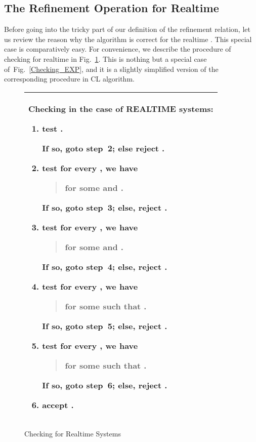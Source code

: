 \documentclass{llncs}
\begin{document}
\subsection{The Refinement Operation for Realtime }\label{subsec:Expansion_Pre}
Before going into the tricky part of our definition of the refinement relation, let us review the reason why the algorithm is correct for the realtime  . This special case is comparatively easy.  For convenience, we describe the procedure of checking  for realtime  in Fig.~\ref{Checking_EXP_REALTIME}. This is nothing but a special case of~Fig.~\ref{Checking_EXP}, and it is a slightly simplified version of the corresponding procedure in CL algorithm.

\begin{figure}[tbp]
\begin{center}
\begin{tabular}{|p{12cm}|}\hline \vspace{0ex}
\textbf{\normalsize Checking   in the case of REALTIME systems:}
\begin{enumerate}
\item
\textbf{test}
  .

If so, goto step~2; else \textbf{reject} . \vspace{1ex}

\item
\textbf{test} for every , we have
\begin{quote}
 for some  and .
\end{quote}
If so, goto step~3; else, \textbf{reject} . \vspace{1ex}

\item
\textbf{test} for every , we have
\begin{quote}
  for some  and .
\end{quote}
If so, goto step~4; else, \textbf{reject} . \vspace{1ex}




\item
\textbf{test}  for every , we have
\begin{quote}
     for some  such that .
\end{quote}
If so, goto step~5; else, \textbf{reject} . \vspace{1ex}

\item
\textbf{test}  for every  , we have
\begin{quote}
     for some  such that .
\end{quote}
If so, goto step~6; else, \textbf{reject} . \vspace{1ex}

\item
\textbf{accept} .
\vspace{-1ex}
\end{enumerate} \\
        \hline
\end{tabular}\vspace{-1ex}
\end{center}
\caption{Checking   for Realtime Systems}\label{Checking_EXP_REALTIME}
\end{figure}
\end{document}
